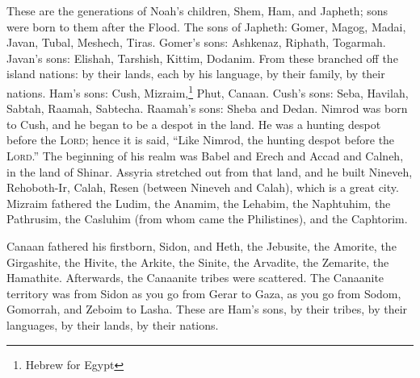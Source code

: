 
\begin{inparaenum}
     These are the generations of Noah's children, Shem, Ham, and Japheth; sons were born to them after the Flood.%
     The sons of Japheth: Gomer, Magog, Madai, Javan, Tubal, Meshech, Tiras.%
     Gomer's sons: Ashkenaz, Riphath, Togarmah.%
     Javan's sons: Elishah, Tarshish, Kittim, Dodanim.%
     From these branched off the island nations: by their lands, each by his language, by their family, by their nations.%
     Ham's sons: Cush, Mizraim,\footnote{Hebrew for Egypt} Phut, Canaan.%
     Cush's sons: Seba, Havilah, Sabtah, Raamah, Sabtecha. Raamah's sons: Sheba and Dedan.%
     Nimrod was born to Cush, and he began to be a despot in the land.%
     He was a hunting despot before the \textsc{Lord}; hence it is said, ``Like Nimrod, the hunting despot before the \textsc{Lord}.''%
     The beginning of his realm was Babel and Erech and Accad and Calneh, in the land of Shinar.%
     Assyria stretched out from that land, and he built Nineveh, Rehoboth-Ir, Calah,%
     Resen (between Nineveh and Calah), which is a great city.%
     Mizraim fathered the Ludim, the Anamim, the Lehabim, the Naphtuhim,%
     the Pathrusim, the Casluhim (from whom came the Philistines), and the Caphtorim.%
    
     Canaan fathered his firstborn, Sidon, and Heth,%
     the Jebusite, the Amorite, the Girgashite,%
     the Hivite, the Arkite, the Sinite,%
     the Arvadite, the Zemarite, the Hamathite. Afterwards, the Canaanite tribes were scattered.%
     The Canaanite territory was from Sidon as you go from Gerar to Gaza, as you go from Sodom, Gomorrah, and Zeboim to Lasha.%
     These are Ham's sons, by their tribes, by their languages, by their lands, by their nations.%
    

\end{inparaenum}
